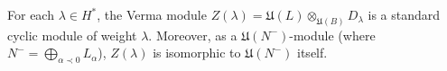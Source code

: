 For each $\lambda \in H^*$, the Verma module $Z(\lambda) = \mathfrak{U}(L) \otimes_{\mathfrak{U}(B)} D_\lambda$ is a standard cyclic module of weight $\lambda$. Moreover, as a $\mathfrak{U}(N^-)$-module (where $N^- = \bigoplus_{\alpha \prec 0} L_\alpha$), $Z(\lambda)$ is isomorphic to $\mathfrak{U}(N^-)$ itself.
